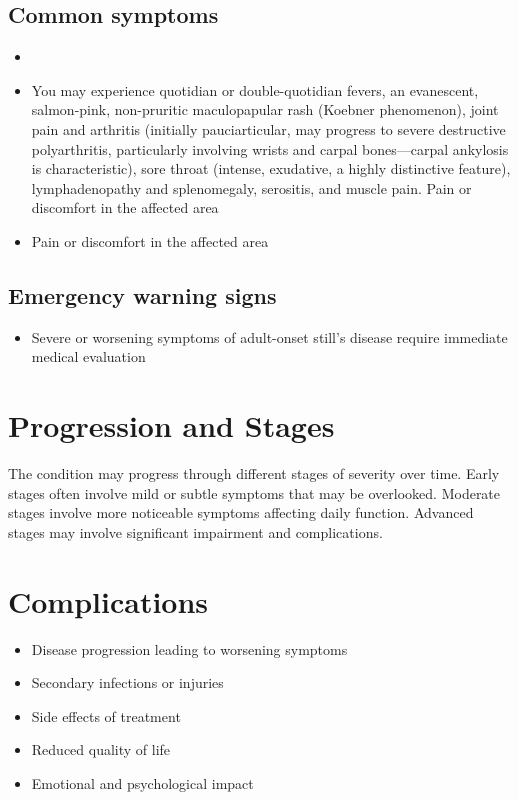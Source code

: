 \subsection{Common symptoms}
\begin{itemize}[noitemsep]
  \item \item You may experience quotidian or double-quotidian fevers, an evanescent, salmon-pink, non-pruritic maculopapular rash (Koebner phenomenon), joint pain and arthritis (initially pauciarticular, may progress to severe destructive polyarthritis, particularly involving wrists and carpal bones---carpal ankylosis is characteristic), sore throat (intense, exudative, a highly distinctive feature), lymphadenopathy and splenomegaly, serositis, and muscle pain. Pain or discomfort in the affected area    \item Pain or discomfort in the affected area
  \end{itemize}

\subsection{Emergency warning signs}
\begin{itemize}[noitemsep]
  \item Severe or worsening symptoms of adult-onset still's disease require immediate medical evaluation
\end{itemize}
\section{Progression and Stages}
The condition may progress through different stages of severity over time. Early stages often involve mild or subtle symptoms that may be overlooked. Moderate stages involve more noticeable symptoms affecting daily function. Advanced stages may involve significant impairment and complications.
\section{Complications}
\begin{itemize}[noitemsep]
  \item Disease progression leading to worsening symptoms
  \item Secondary infections or injuries
  \item Side effects of treatment
  \item Reduced quality of life
  \item Emotional and psychological impact
\end{itemize}
